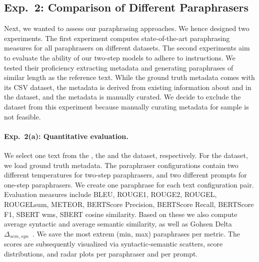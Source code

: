 \subsection{Exp.\ 2: Comparison of Different Paraphrasers}
\label{subsec:comp_paraphrasers_setup}

Next, we wanted to assess our paraphrasing approaches.
We hence designed two experiments.
The first experiment computes state-of-the-art paraphrasing measures for all paraphrasers on different datasets.
The second experiments aim to evaluate the ability of our two-step models to adhere to instructions.
We tested their proficiency extracting metadata and generating paraphrases of similar length as the reference text.
While the \dataBlog{} ground truth metadata comes with its CSV dataset, the \dataStudent{} metadata is derived from existing information about and in the dataset, and the \dataGutenberg{} metadata is manually curated.
We decide to exclude the \dataPan{} dataset from this experiment because manually curating metadata for \dataPan{} sample is not feasible.

\paragraph{Exp.\ 2(a): Quantitative evaluation.}

We select one text from the \dataBlog{}, the \dataGutenberg{} and the \dataStudent{} dataset, respectively.
For the \dataGutenberg{} dataset, we load ground truth metadata. %
The paraphraser configurations contain two different temperatures for two-step paraphrasers, and two different prompts for one-step paraphrasers.
We create one paraphrase for each text configuration pair.
Evaluation measures include BLEU, ROUGE1, ROUGE2, ROUGEL, ROUGELsum, METEOR, BERTScore Precision, BERTScore Recall, BERTScore F1, SBERT \ac{wms}, SBERT cosine similarity.
Based on these we also compute average syntactic and average semantic similarity, as well as Gohsen Delta $\Delta_{sem,syn}$~\citep{gohsen_captions_2023}.
We save the most extrem (min, max) paraphrases per metric.
The scores are subsequently visualized via syntactic-semantic scatters, score distributions, and radar plots per paraphraser and per prompt. 

